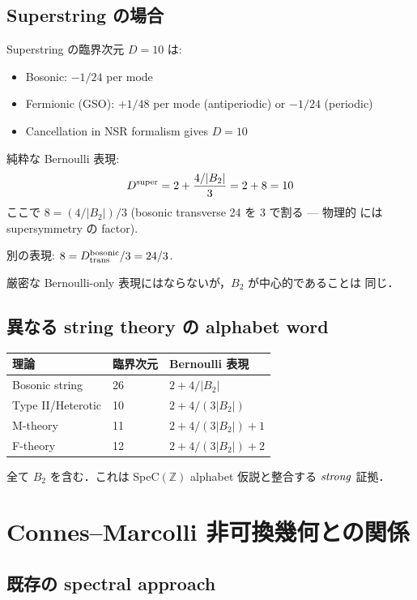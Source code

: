 \documentclass[11pt,a4paper]{article}
\begin{document}
\subsection{Superstring の場合}

Superstring の臨界次元 $D = 10$ は:
\begin{itemize}
\item Bosonic: $-1/24$ per mode
\item Fermionic (GSO): $+1/48$ per mode (antiperiodic) or $-1/24$ (periodic)
\item Cancellation in NSR formalism gives $D = 10$
\end{itemize}

純粋な Bernoulli 表現:
\begin{equation}
D^{\rm super} = 2 + \frac{4/|B_2|}{3} = 2 + 8 = 10
\end{equation}
ここで $8 = (4/|B_2|)/3$ (bosonic transverse 24 を 3 で割る — 物理的
には supersymmetry の factor).

別の表現: $8 = D^{\rm bosonic}_{\rm trans}/3 = 24/3$.

厳密な Bernoulli-only 表現にはならないが，$B_2$ が中心的であることは
同じ．

\subsection{異なる string theory の alphabet word}

\begin{center}
\begin{tabular}{lll}
\toprule
理論 & 臨界次元 & Bernoulli 表現 \\
\midrule
Bosonic string & 26 & $2 + 4/|B_2|$ \\
Type II/Heterotic & 10 & $2 + 4/(3|B_2|)$ \\
M-theory & 11 & $2 + 4/(3|B_2|) + 1$ \\
F-theory & 12 & $2 + 4/(3|B_2|) + 2$ \\
\bottomrule
\end{tabular}
\end{center}

全て $B_2$ を含む．これは SpeC$(\mathbb{Z})$ alphabet 仮説と整合する
$\it{strong}$ 証拠．

\section{Connes--Marcolli 非可換幾何との関係}

\subsection{既存の spectral approach}
\end{document}
